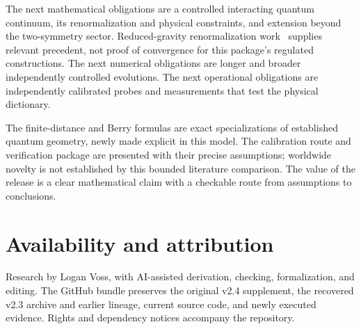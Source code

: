 \documentclass[11pt]{article}
\begin{document}
The next mathematical obligations are a controlled interacting quantum continuum, its renormalization and physical constraints, and extension beyond the two-symmetry sector. Reduced-gravity renormalization work~\cite{Niedermaier} supplies relevant precedent, not proof of convergence for this package's regulated constructions. The next numerical obligations are longer and broader independently controlled evolutions. The next operational obligations are independently calibrated probes and measurements that test the physical dictionary.

The finite-distance and Berry formulas are exact specializations of established quantum geometry, newly made explicit in this model. The calibration route and verification package are presented with their precise assumptions; worldwide novelty is not established by this bounded literature comparison. The value of the release is a clear mathematical claim with a checkable route from assumptions to conclusions.

\section*{Availability and attribution}
Research by Logan Voss, with AI-assisted derivation, checking, formalization, and editing. The GitHub bundle preserves the original v2.4 supplement, the recovered v2.3 archive and earlier lineage, current source code, and newly executed evidence. Rights and dependency notices accompany the repository.
\end{document}

